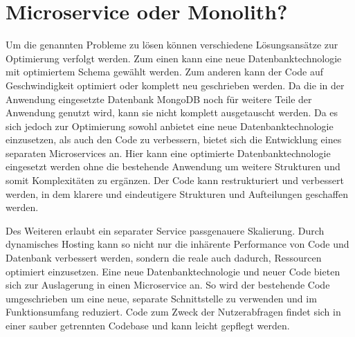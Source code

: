 \section{Microservice oder Monolith?}
Um die genannten Probleme zu lösen können verschiedene Lösungsansätze zur Optimierung verfolgt werden. Zum einen kann eine neue Datenbanktechnologie mit optimiertem Schema gewählt werden. Zum anderen kann der Code auf Geschwindigkeit optimiert oder komplett neu geschrieben werden.
Da die in der Anwendung eingesetzte Datenbank MongoDB noch für weitere Teile der Anwendung genutzt wird, kann sie nicht komplett ausgetauscht werden. Da es sich jedoch zur Optimierung sowohl anbietet eine neue Datenbanktechnologie einzusetzen, als auch den Code zu verbessern, bietet sich die Entwicklung eines separaten Microservices an. Hier kann eine optimierte Datenbanktechnologie eingesetzt werden ohne die bestehende Anwendung um weitere Strukturen und somit Komplexitäten zu ergänzen. Der Code kann restrukturiert und verbessert werden, in dem klarere und eindeutigere Strukturen und Aufteilungen geschaffen werden.

Des Weiteren erlaubt ein separater Service passgenauere Skalierung. Durch dynamisches Hosting kann so nicht nur die inhärente Performance von Code und Datenbank verbessert werden, sondern die reale auch dadurch, Ressourcen optimiert einzusetzen.
Eine neue Datenbanktechnologie und neuer Code bieten sich zur Auslagerung in einen Microservice an. So wird der bestehende Code umgeschrieben um eine neue, separate Schnittstelle zu verwenden und im Funktionsumfang reduziert. Code zum Zweck der Nutzerabfragen findet sich in einer sauber getrennten Codebase und kann leicht gepflegt werden.

